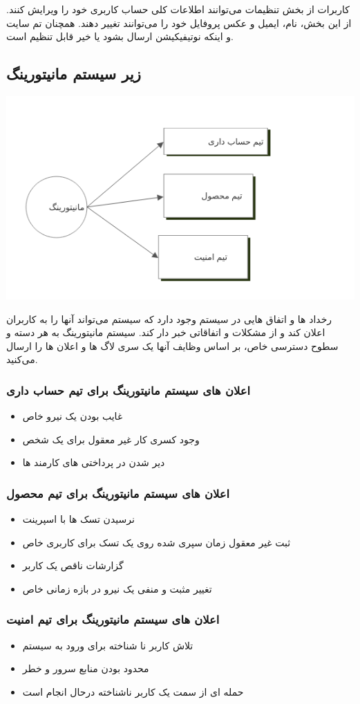 کاربرات از بخش تنظیمات می‌توانند اطلاعات کلی حساب کاربری خود را ویرایش کنند. از این بخش، نام، ایمیل و عکس پروفایل خود را می‌توانند تغییر دهند.
همچنان تم سایت و اینکه نوتیفیکیشن ارسال بشود یا خیر قابل تنظیم است.

\subsection{زیر سیستم مانیتورینگ}
\includegraphics[scale=0.8]{assets/monitoring_dfd.png}

رخداد ها و اتفاق هایی در سیستم وجود دارد که سیستم می‌تواند آنها را به کاربران اعلان کند و از مشکلات و اتفاقاتی خبر دار کند.
سیستم مانیتورینگ به هر دسته و سطوح دسترسی خاص، بر اساس وظایف آنها یک سری لاگ ها و اعلان ها را ارسال می‌کنید.

\subsubsection{اعلان های سیستم مانیتورینگ برای تیم حساب داری}
\begin{itemize}
	\item غایب بودن یک نیرو خاص
	\item وجود کسری کار غیر معقول برای یک شخص
	\item دیر شدن در پرداختی های کارمند ها 
\end{itemize}

\subsubsection{اعلان های سیستم مانیتورینگ برای تیم محصول}
\begin{itemize}
	\item نرسیدن تسک ها با اسپرینت
	\item ثبت غیر معقول زمان سپری شده روی یک تسک برای کاربری خاص
	\item گزارشات ناقص یک کاربر
	\item تغییر مثبت و منفی یک نیرو در بازه زمانی خاص
\end{itemize}

\subsubsection{اعلان های سیستم مانیتورینگ برای تیم امنیت}
\begin{itemize}
	\item تلاش کاربر نا شناخته برای ورود به سیستم
	\item محدود بودن منابع سرور و خطر
	\item حمله ای از سمت یک کاربر ناشناخته درحال انجام است
\end{itemize}
